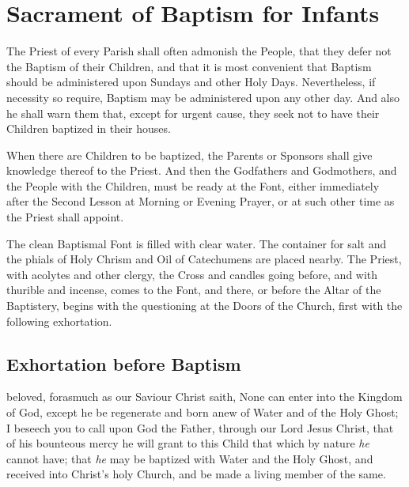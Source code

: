 \section{Sacrament of Baptism for Infants}
\begin{secrubric}
	The Priest of every Parish shall often admonish the People, that they defer not the Baptism of their Children, and that it is most convenient that Baptism should be administered upon Sundays and other Holy Days. Nevertheless, if necessity so require, Baptism may be administered upon any other day. And also he shall warn them that, except for urgent cause, they seek not to have their Children baptized in their houses.
\end{secrubric}

\begin{rubric}
	When there are Children to be baptized, the Parents or Sponsors shall give knowledge thereof to the Priest. And then the Godfathers and Godmothers, and the People with the Children, must be ready at the Font, either immediately after the Second Lesson at Morning or Evening Prayer, or at such other time as the Priest shall appoint.
\end{rubric}

\begin{rubric}%
    The clean Baptismal Font is filled with clear water. The container for salt and the phials of Holy Chrism and Oil of Catechumens are placed nearby. The Priest, with acolytes and other clergy, the Cross and candles going before, and with thurible and incense, comes to the Font, and there, or before the Altar of the Baptistery, begins with the questioning at the Doors of the Church, first with the following exhortation.
\end{rubric}

\subsection{Exhortation before Baptism}

 beloved, forasmuch as our Saviour Christ saith, None can enter into the Kingdom of God, except he be regenerate and born anew of Water and of the Holy Ghost; I beseech you to call upon God the Father, through our Lord Jesus Christ, that of his bounteous mercy he will grant to this Child that which by nature \emph{he} cannot have; that \emph{he} may be baptized with Water and the Holy Ghost, and received into Christ's holy Church, and be made a living member of the same.\\

